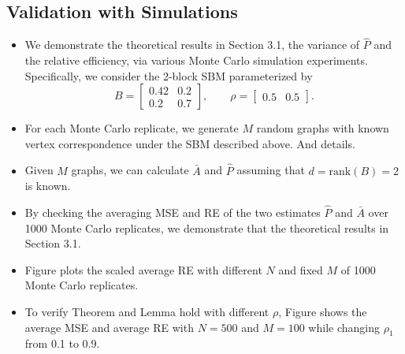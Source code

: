 \documentclass[a4paper]{article}
\begin{document}
\subsection{Validation with Simulations}
\begin{itemize}
\item We demonstrate the theoretical results in Section 3.1, the variance of $\hat{P}$ and the relative efficiency, via various Monte Carlo simulation experiments. Specifically, we consider the 2-block SBM parameterized by
\begin{equation*}
B = \begin{bmatrix}
0.42 & 0.2 \\
0.2 & 0.7
\end{bmatrix}
,\qquad \rho = \begin{bmatrix}
0.5 & 0.5
\end{bmatrix}.
\end{equation*}
\item For each Monte Carlo replicate, we generate $M$ random graphs with known vertex correspondence under the SBM described above. And details.
\item Given $M$ graphs, we can calculate $\bar{A}$ and $\hat{P}$ assuming that $d = \mathrm{rank}(B) = 2$ is known. 
\item By checking the averaging MSE and RE of the two estimates $\hat{P}$ and $\bar{A}$ over 1000 Monte Carlo replicates, we demonstrate that the theoretical results in Section 3.1.
\item Figure plots the scaled average RE with different $N$ and fixed $M$ of 1000 Monte Carlo replicates. 
\item To verify Theorem and Lemma hold with different $\rho$, Figure shows the average MSE and average RE with $N = 500$ and $M = 100$ while changing $\rho_1$ from 0.1 to 0.9. 
\end{itemize}
\end{document}
